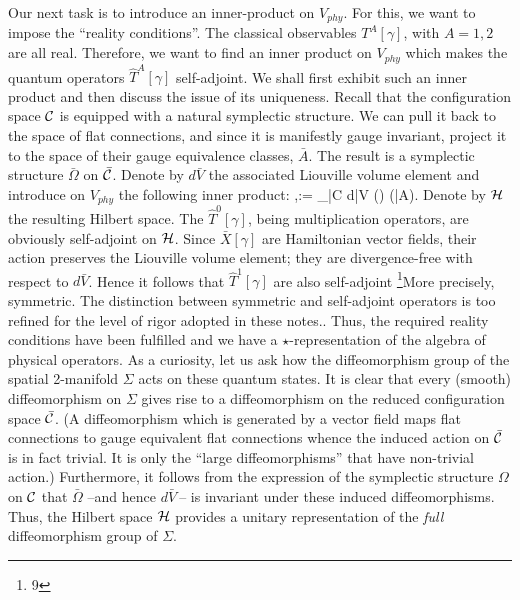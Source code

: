 Our next task is to introduce an inner-product on $V_{phy}$. For this, we
want to impose the ``reality conditions''. The classical observables
$T^A[\gamma ]$, with $A=1,2$ are all real. Therefore, we want to find an
inner product on
$V_{phy}$ which makes the quantum operators ${\hat T}^A[\gamma ]$ self-adjoint.
We shall first exhibit such an inner product and then discuss the issue of its
uniqueness. Recall that the configuration space ${\cal C}$ is equipped with a
natural symplectic structure. We can pull it back to the space of flat
connections, and since it is manifestly gauge invariant, project it to the
space of their gauge equivalence classes, $\bar{A}$. The result is a symplectic
structure $\bar\Omega$ on $\bar{\cal C}$. Denote by $d\bar{V}$ the associated
Liouville volume element and introduce on $V_{phy}$ the following inner
product:
\bneq
\langle\Psi\>,\>\Phi\rangle := \lint_{\bar{\cal C}} d\bar{V}\>
\>() \Phi (\bar{A})\>\>.
Denote by ${\cal H}$ the resulting Hilbert space. The ${\hat T}^0[\gamma ]$,
being multiplication operators, are obviously self-adjoint on ${\cal H}$.
Since $\bar{X}[\gamma ]$ are Hamiltonian vector fields, their action preserves
the Liouville volume element; they are divergence-free with respect to
$d\bar{V}$. Hence it follows that ${\hat T}^1[\gamma ]$ are also self-adjoint
\footnote{9}{More precisely, symmetric. The distinction between symmetric
and self-adjoint operators is too refined for the level of rigor adopted in
these notes.}. Thus, the required reality conditions have been fulfilled and
we have a $\star$-representation of the algebra of physical operators. As a
curiosity, let us ask how the diffeomorphism group of the spatial 2-manifold
$\Sigma$ acts on these quantum states. It is clear that every (smooth)
diffeomorphism on $\Sigma$ gives rise to a diffeomorphism on the reduced
configuration space $\bar{\cal C}$. (A diffeomorphism which is generated by a
vector field maps flat connections to gauge equivalent flat connections whence
the induced action on $\bar{\cal C}$ is in fact trivial. It is only the
``large diffeomorphisms'' that have non-trivial action.) Furthermore, it
follows from the expression of the symplectic structure $\Omega$ on ${\cal C}$
that $\bar\Omega$ --and hence $d\bar{V}\>$-- is invariant under these induced
diffeomorphisms. Thus, the Hilbert space ${\cal H}$ provides a unitary
representation of the {\it full} diffeomorphism group of $\Sigma$.

